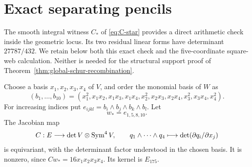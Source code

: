 \section{Exact separating pencils}
\label{app:separating-pencils}

The smooth integral witness \(C_*\) of \eqref{eq:C-star} provides
a direct arithmetic check inside the geometric locus.  Its two residual
linear forms have determinant \(27787/432\).  We retain below both
this exact check and the five-coordinate square-web calculation.
Neither is needed for the structural support proof of
Theorem~\ref{thm:global-schur-recombination}.

Choose a basis \(x_1,x_2,x_3,x_4\) of \(V\), and order the
monomial basis of \(W\) as
\[
 (b_1,\ldots,b_{10})=
 (x_1^2,x_1x_2,x_1x_3,x_1x_4,x_2^2,
 x_2x_3,x_2x_4,x_3^2,x_3x_4,x_4^2).
\]
For increasing indices put \(e_{ijkl}=b_i\wedge b_j\wedge
b_k\wedge b_l\).  Let
\[
 w_*=e_{1,5,8,10}.
\]
The Jacobian map
\[
 C:E\longrightarrow\det V\otimes\operatorname{Sym}^4V,\qquad
 q_1\wedge\cdots\wedge q_4\longmapsto
 \det(\partial q_i/\partial x_j)
\]
is equivariant, with the determinant factor understood in the chosen
basis.  It is nonzero, since \(Cw_*=16x_1x_2x_3x_4\).
Its kernel is \(E_{175}\).

